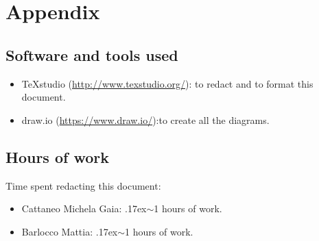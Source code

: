 \documentclass[18pt,oneside,a4paper, titlepage]{article}
\begin{document}
	\section{Appendix}
		\subsection{Software and tools used}
				\begin{itemize}
					\item TeXstudio (\url{http://www.texstudio.org/}): to redact and to format this document.
					\item draw.io (\url{https://www.draw.io/}):to create all the diagrams.
				\end{itemize}
		\subsection{Hours of work}
			Time spent redacting this document:
			\begin{itemize}
				\item Cattaneo Michela Gaia: {\raise.17ex\hbox{$\scriptstyle\sim$}}1 hours of work.
				\item Barlocco Mattia: {\raise.17ex\hbox{$\scriptstyle\sim$}}1 hours of work.
			\end{itemize}
		
		
		
\end{document}
